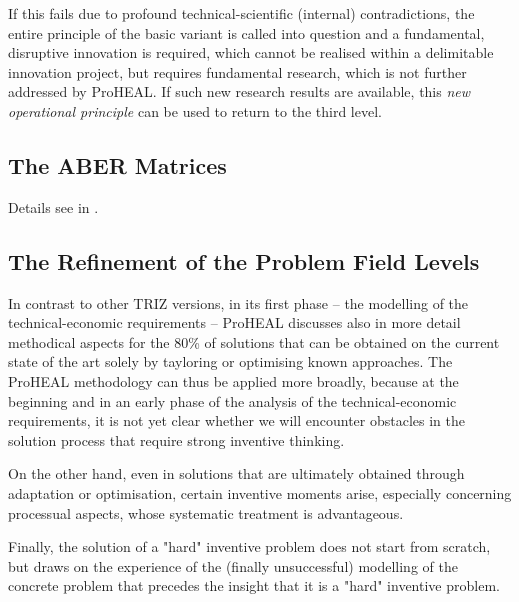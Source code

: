 \documentclass[11pt,a4paper]{article}
\begin{document}
If this fails due to profound technical-scientific (internal) contradictions,
the entire principle of the basic variant is called into question and a
fundamental, disruptive innovation is required, which cannot be realised
within a delimitable innovation project, but requires fundamental research,
which is not further addressed by ProHEAL. If such new research results are
available, this \emph{new operational principle} can be used to return to the
third level.

\subsection{The ABER Matrices}

Details see in \cite{ProHEAL-21}.

\subsection{The Refinement of the Problem Field Levels}

In contrast to other TRIZ versions, in its first phase -- the modelling of the
technical-economic requirements -- ProHEAL discusses also in more detail
methodical aspects for the 80\% of solutions that can be obtained on the
current state of the art solely by tayloring or optimising known approaches.
The ProHEAL methodology can thus be applied more broadly, because at the
beginning and in an early phase of the analysis of the technical-economic
requirements, it is not yet clear whether we will encounter obstacles in the
solution process that require strong inventive thinking.

On the other hand, even in solutions that are ultimately obtained through
adaptation or optimisation, certain inventive moments arise, especially
concerning processual aspects, whose systematic treatment is advantageous.

Finally, the solution of a "hard" inventive problem does not start from
scratch, but draws on the experience of the (finally unsuccessful) modelling
of the concrete problem that precedes the insight that it is a "hard"
inventive problem.
\end{document}
